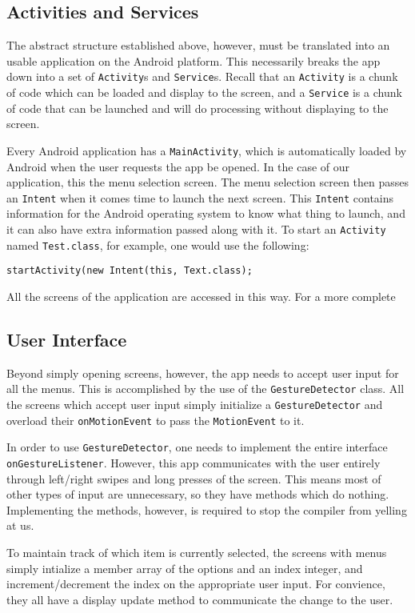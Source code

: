 \subsection{Activities and Services}

The abstract structure established above, however, must be translated into an usable application on the Android platform. This necessarily 
breaks the app down into a set of \verb|Activity|s and \verb|Service|s. Recall that an \verb|Activity| is a chunk of code which can be loaded
and display to the screen, and a \verb|Service| is a chunk of code that can be launched and will do processing without displaying to the 
screen.

Every Android application has a \verb|MainActivity|, which is automatically loaded by Android when the user requests the app be opened. 
In the case of our application, this the menu selection screen. The menu selection screen then passes an \verb|Intent| when it comes time to launch the next screen.
This \verb|Intent| contains information for the Android operating system to know what thing to launch, and it can also have extra information passed along with it.
To start an \verb|Activity| named \verb|Test.class|, for example, one would use the following:
\begin{verbatim}
startActivity(new Intent(this, Text.class);
\end{verbatim}
All the screens of the application are accessed in this way. For a more complete

\subsection{User Interface}
Beyond simply opening screens, however, the app needs to accept user input for all the menus. This is accomplished by the use of the \verb|GestureDetector| class.
All the screens which accept user input simply initialize a \verb|GestureDetector| and overload their \verb|onMotionEvent| to pass the \verb|MotionEvent| to it.

In order to use \verb|GestureDetector|, one needs to implement the entire interface \verb|onGestureListener|. However, this app communicates with the user entirely through
left/right swipes and long presses of the screen. This means most of other types of input are unnecessary, so they have methods which do nothing. Implementing the methods, 
however, is required to stop the compiler from yelling at us. 

To maintain track of which item is currently selected, the screens with menus simply intialize a member array of the options and an index integer, and increment/decrement the
index on the appropriate user input. For convience, they all have a display update method to communicate the change to the user.

